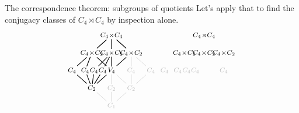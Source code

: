 \documentclass[8pt]{beamer}
\begin{document}
\begin{frame}{The correspondence theorem: subgroups of quotients}
  Let's apply that to find the conjugacy classes of $C_4\!\rtimes\!C_4$
  by inspection alone.
  \[
  \begin{tikzpicture}[shorten >= -2pt, shorten <= -2pt,xscale=1.2,scale=.7]
    \tikzstyle{every node}=[font=\footnotesize]
    \begin{scope}[shift={(0,0)},scale=.75,yscale=1.6,scale=.9]
      \node (G) at (0,4) {$C_4\!\rtimes\!C_4$};
      \node (C4xC2-1) at (-1.5,3) {$C_4\!\times\!C_2$};
      \node (C4xC2-2) at (0,3) {$C_4\!\times\!C_2$};
      \node (C4xC2-3) at (1.5,3) {$C_4\!\times\!C_2$};
      \node (C4-1) at (-3,2) {$C_4$};
      \node (C4-2) at (-2,2) {$C_4$};
      \node (C4-3) at (-1.33,2) {$C_4$};
      \node (C4-4) at (-.67,2) {$C_4$};
      \node [faded] (C4-5) at (1.5,2) {$C_4$};
      \node [faded] (C4-6) at (3,2) {$C_4$};
      \node (V4) at (0,2) {$V_4$};
      \node (C2-1) at (-1.5,1) {$C_2$};
      \node [faded] (C2-2) at (0,1) {$C_2$};
      \node [faded] (C2-3) at (1.5,1) {$C_2$};
      \node [faded] (1) at (0,0) {$C_1$};
      \draw [thick] (G) to (C4xC2-1);
      \draw [thick] (G) to (C4xC2-2);
      \draw [thick] (G) to (C4xC2-3);
      \draw [thick] (C4xC2-1) to (C4-1);
      \draw [thick] (C4xC2-1) to (C4-2);
      \draw [thick] (C4xC2-1) to (V4); 
      \draw [thick] (C4xC2-2) to (C4-3);
      \draw [thick] (C4xC2-2) to (C4-4);
      \draw [thick] (C4xC2-2) to (V4); 
      \draw [faded] (C4xC2-3) to (C4-5);
      \draw [faded] (C4xC2-3) to (C4-6);
      \draw [thick] (C4xC2-3) to (V4);
      \draw [thick] (C4-1) to (C2-1); \draw [thick] (C4-2) to (C2-1);
      \draw [thick] (C4-3) to (C2-1); \draw [thick] (C4-4) to (C2-1);
      \draw [thick] (V4) to (C2-1); 
      \draw [faded] (V4) to (C2-2); \draw [faded] (V4) to (C2-3);
      \draw [faded] (C4-5) to (C2-3); \draw [faded] (C4-6) to (C2-3);
      \draw [faded] (C2-1) to (1); 
      \draw [faded] (C2-2) to (1); 
      \draw [faded] (C2-3) to (1);
    \end{scope}
    \begin{scope}[shift={(4.75,0)},scale=.75,yscale=1.6,scale=.9]
      \node (G) at (0,4) {$C_4\!\rtimes\!C_4$};
      \node (C4xC2-1) at (-1.5,3) {$C_4\!\times\!C_2$};
      \node (C4xC2-2) at (0,3) {$C_4\!\times\!C_2$};
      \node (C4xC2-3) at (1.5,3) {$C_4\!\times\!C_2$};
      \node [faded] (C4-1) at (-3,2) {$C_4$};
      \node [faded] (C4-2) at (-2,2) {$C_4$};
      \node [faded] (C4-3) at (-1.33,2) {$C_4$};
      \node [faded] (C4-4) at (-.67,2) {$C_4$};
      \node [faded] (C4-5) at (1.5,2) {$C_4$};

\end{scope}
\end{tikzpicture}\]
\end{frame}
\end{document}

